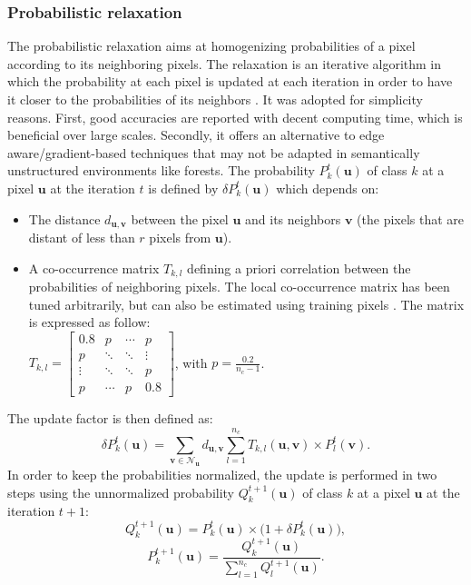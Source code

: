 \subsubsection{Probabilistic relaxation}
The probabilistic relaxation aims at homogenizing probabilities of a pixel according to its neighboring pixels. The relaxation is an iterative algorithm in which the probability at each pixel is updated at each iteration in order to have it closer to the probabilities of its neighbors \cite{Gong198933}. It was adopted for simplicity reasons. First, good accuracies are reported with decent computing time, which is beneficial over large scales. Secondly, it offers an alternative to edge aware/gradient-based techniques that may not be adapted in semantically unstructured environments like forests. The probability $P_{k}^{t}(\mathbf{u})$ of class $k$ at a pixel $\mathbf{u}$ at the iteration $t$ is defined by  $\delta P_{k}^{t}(\mathbf{u})$ which depends on:
\begin{itemize}
\item The distance $d_{\mathbf{u},\mathbf{v}}$ between the pixel $\mathbf{u}$ and its neighbors $\mathbf{v}$ (the pixels that are distant of less than $r$ pixels from $\mathbf{u}$).
\item A co-occurrence matrix $T_{k,l}$ defining a priori correlation between the probabilities of neighboring pixels. The local co-occurrence matrix has been tuned arbitrarily, but can also be estimated using training pixels \cite{VolpiCVPR2015}. The matrix is expressed as follow: \\
$T_{k,l}=\begin{bmatrix}
0.8 & p & \cdots & p \\
p & \ddots & \ddots & \vdots \\
\vdots & \ddots & \ddots & p \\
p & \cdots & p & 0.8
\end{bmatrix}$, with $p=\frac{0.2}{n_{c}-1}$.
\end{itemize}
The update factor is then defined as:
\begin{equation}
\delta P_{k}^{t}(\mathbf{u})=\sum_{\mathbf{v} \in \mathcal{N_{\mathbf{u}}}} d_{\mathbf{u},\mathbf{v}} \sum_{l=1}^{n_{c}} T_{k,l}(\mathbf{u},\mathbf{v}) \times P_{l}^{t}(\mathbf{v}).
\end{equation}
In order to keep the probabilities normalized, the update is performed in two steps using the unnormalized probability $Q_{k}^{t+1}(\mathbf{u})$ of class $k$ at a pixel $\mathbf{u}$ at the iteration $t+1$:
\begin{equation}
Q_{k}^{t+1}(\mathbf{u})=P_{k}^{t}(\mathbf{u}) \times \big(1 + \delta P_{k}^{t}(\mathbf{u})\big),
\end{equation}
\begin{equation}
P_{k}^{t+1}(\mathbf{u})=\frac{Q_{k}^{t+1}(\mathbf{u})}{\sum_{l=1}^{n_{c}}Q_{l}^{t+1}(\mathbf{u})}.
\end{equation}

